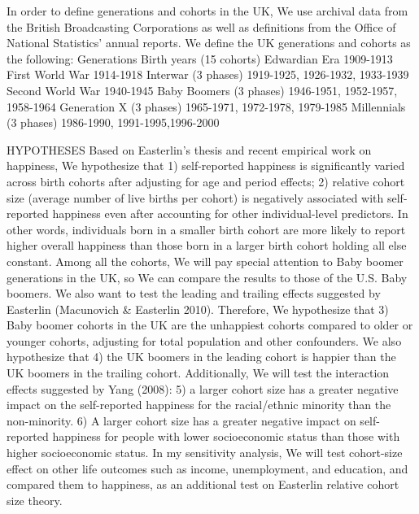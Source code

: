 In order to define generations and cohorts in the UK, We use archival data from the British Broadcasting Corporations as well as definitions from the Office of National Statistics’ annual reports. We define the UK generations and cohorts as the following:
Generations
Birth years (15 cohorts)
Edwardian Era
1909-1913
First World War
1914-1918
Interwar (3 phases)
1919-1925, 1926-1932, 1933-1939
Second World War
1940-1945
Baby Boomers (3 phases)
1946-1951, 1952-1957, 1958-1964
Generation X (3 phases)
1965-1971, 1972-1978, 1979-1985
Millennials (3 phases)
1986-1990, 1991-1995,1996-2000

HYPOTHESES
Based on Easterlin’s thesis and recent empirical work on happiness, We hypothesize that 1) self-reported happiness is significantly varied across birth cohorts after adjusting for age and period effects; 2) relative cohort size (average number of live births per cohort) is negatively associated with self-reported happiness even after accounting for other individual-level predictors. In other words, individuals born in a smaller birth cohort are more likely to report higher overall happiness than those born in a larger birth cohort holding all else constant.
Among all the cohorts, We will pay special attention to Baby boomer generations in the UK, so We can compare the results to those of the U.S. Baby boomers. We also want to test the leading and trailing effects suggested by Easterlin (Macunovich & Easterlin 2010). Therefore, We hypothesize that 3) Baby boomer cohorts in the UK are the unhappiest cohorts compared to older or younger cohorts, adjusting for total population and other confounders. We also hypothesize that 4) the UK boomers in the leading cohort is happier than the UK boomers in the trailing cohort.
Additionally, We will test the interaction effects suggested by Yang (2008): 5) a larger cohort size has a greater negative impact on the self-reported happiness for the racial/ethnic minority than the non-minority. 6) A larger cohort size has a greater negative impact on self-reported happiness for people with lower socioeconomic status than those with higher socioeconomic status. In my sensitivity analysis, We will test cohort-size effect on other life outcomes such as income, unemployment, and education, and compared them to happiness, as an additional test on Easterlin relative cohort size theory.

